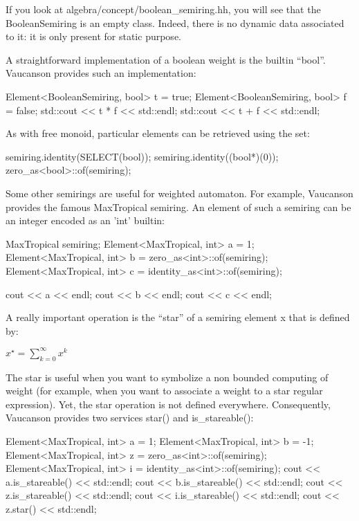 \documentclass{article}
\begin{document}
If you look at algebra/concept/boolean\_semiring.hh, you will see that
the BooleanSemiring is an empty class. Indeed, there is no dynamic
data associated to it: it is only present for static purpose.

A straightforward implementation of a boolean weight is the builtin
``bool''. Vaucanson provides such an implementation:

\begin{code}
Element<BooleanSemiring, bool> t = true;
Element<BooleanSemiring, bool> f = false;
std::cout << t * f << std::endl;
std::cout << t + f << std::endl;
\end{code}

As with free monoid, particular elements can be retrieved using the set:

\begin{code}
semiring.identity(SELECT(bool));
semiring.identity((bool*)(0));
zero_as<bool>::of(semiring);
\end{code}

Some other semirings are useful for weighted automaton. For example,
Vaucanson provides the famous MaxTropical semiring. An element of such
a semiring can be an integer encoded as an 'int' builtin:

\begin{code}
MaxTropical semiring;
Element<MaxTropical, int> a = 1;
Element<MaxTropical, int> b = zero_as<int>::of(semiring);
Element<MaxTropical, int> c = identity_as<int>::of(semiring);

cout << a << endl;
cout << b << endl;
cout << c << endl;

\end{code}

A really important operation is the ``star'' of a semiring element x
that is defined by:

\begin{center}
\begin{math}
x^{\star} = \sum_{k=0}^{\infty}{x^k}
\end{math}
\end{center}
The star is useful when you want to symbolize a non bounded computing
of weight (for example, when you want to associate a weight to a star
regular expression). Yet, the star operation is not defined
everywhere.  Consequently, Vaucanson provides two services star() and
is\_stareable():

\begin{code}
Element<MaxTropical, int> a = 1;
Element<MaxTropical, int> b = -1;
Element<MaxTropical, int> z = zero_as<int>::of(semiring);
Element<MaxTropical, int> i = identity_as<int>::of(semiring);
cout << a.is_stareable() << std::endl;
cout << b.is_stareable() << std::endl;
cout << z.is_stareable() << std::endl;
cout << i.is_stareable() << std::endl;
cout << z.star() << std::endl;
\end{code}
\end{document}
